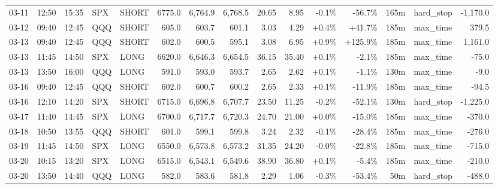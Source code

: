 \documentclass[11pt,a4paper,twoside]{article}
\begin{document}
\begin{landscape}
\begin{center}
\begin{longtable}{>{\color{txtmain}}l l l l l r r r r r r r r >{\color{txtmain}}l r}
03-11 & 12:50 & 15:35 & SPX & SHORT & 6775.0 & 6,764.9 & 6,768.5 & 20.65 & 8.95 & \textcolor{lossred}{-0.1\%} & \textcolor{lossred}{-56.7\%} & 165m & hard\_stop & \textcolor{lossred}{-1,170.0} \\
03-12 & 09:40 & 12:45 & QQQ & SHORT & 605.0 & 603.7 & 601.1 & 3.03 & 4.29 & \textcolor{wingreen}{+0.4\%} & \textcolor{wingreen}{+41.7\%} & 185m & max\_time & \textcolor{wingreen}{379.5} \\
03-13 & 09:40 & 12:45 & QQQ & SHORT & 602.0 & 600.5 & 595.1 & 3.08 & 6.95 & \textcolor{wingreen}{+0.9\%} & \textcolor{wingreen}{+125.9\%} & 185m & max\_time & \textcolor{wingreen}{1,161.0} \\
03-13 & 11:45 & 14:50 & SPX & LONG & 6620.0 & 6,646.3 & 6,654.5 & 36.15 & 35.40 & \textcolor{wingreen}{+0.1\%} & \textcolor{lossred}{-2.1\%} & 185m & max\_time & \textcolor{lossred}{-75.0} \\
03-13 & 13:50 & 16:00 & QQQ & LONG & 591.0 & 593.0 & 593.7 & 2.65 & 2.62 & \textcolor{wingreen}{+0.1\%} & \textcolor{lossred}{-1.1\%} & 130m & max\_time & \textcolor{lossred}{-9.0} \\
03-16 & 09:40 & 12:45 & QQQ & SHORT & 602.0 & 600.7 & 600.2 & 2.65 & 2.33 & \textcolor{wingreen}{+0.1\%} & \textcolor{lossred}{-11.9\%} & 185m & max\_time & \textcolor{lossred}{-94.5} \\
03-16 & 12:10 & 14:20 & SPX & SHORT & 6715.0 & 6,696.8 & 6,707.7 & 23.50 & 11.25 & \textcolor{lossred}{-0.2\%} & \textcolor{lossred}{-52.1\%} & 130m & hard\_stop & \textcolor{lossred}{-1,225.0} \\
03-17 & 11:40 & 14:45 & SPX & LONG & 6700.0 & 6,717.7 & 6,720.3 & 24.70 & 21.00 & \textcolor{wingreen}{+0.0\%} & \textcolor{lossred}{-15.0\%} & 185m & max\_time & \textcolor{lossred}{-370.0} \\
03-18 & 10:50 & 13:55 & QQQ & SHORT & 601.0 & 599.1 & 599.8 & 3.24 & 2.32 & \textcolor{lossred}{-0.1\%} & \textcolor{lossred}{-28.4\%} & 185m & max\_time & \textcolor{lossred}{-276.0} \\
03-19 & 11:45 & 14:50 & SPX & LONG & 6550.0 & 6,573.8 & 6,573.2 & 31.35 & 24.20 & \textcolor{lossred}{-0.0\%} & \textcolor{lossred}{-22.8\%} & 185m & max\_time & \textcolor{lossred}{-715.0} \\
03-20 & 10:15 & 13:20 & SPX & LONG & 6515.0 & 6,543.1 & 6,549.6 & 38.90 & 36.80 & \textcolor{wingreen}{+0.1\%} & \textcolor{lossred}{-5.4\%} & 185m & max\_time & \textcolor{lossred}{-210.0} \\
03-20 & 13:50 & 14:40 & QQQ & LONG & 582.0 & 583.6 & 581.8 & 2.29 & 1.06 & \textcolor{lossred}{-0.3\%} & \textcolor{lossred}{-53.4\%} & 50m & hard\_stop & \textcolor{lossred}{-488.0} \\

\end{longtable}
\end{center}
\end{landscape}
\end{document}
